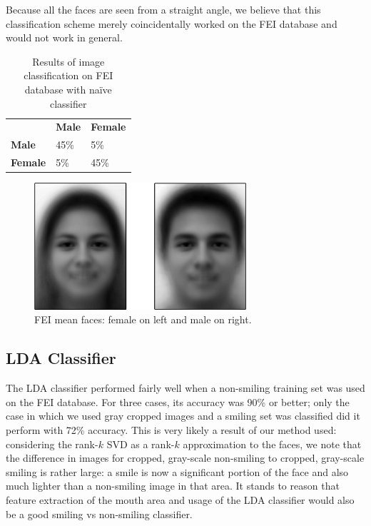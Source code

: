 \documentclass[hidelinks,11pt]{article}
\begin{document}
Because all the faces are seen from a straight angle, we believe that this
classification scheme merely coincidentally worked on the FEI database and would
not work in general.

\begin{table}[!ht]
  \vspace{20pt}
  \centering
  \begin{tabular}{lll}
    \toprule
                      & \bfseries Male  & \bfseries Female  \\
    \bfseries Male    & 45\%            & 5\%               \\
    \bfseries Female  & 5\%             & 45\%              \\
    \bottomrule
  \end{tabular}
  \caption{Results of image classification on FEI database with na\"ive
  classifier}
  \label{tab:analysis:naive:data}
  \vspace{20pt}
\end{table}

\begin{figure}[!ht]
  \centering
  \includegraphics[width=0.7\textwidth]{fei_mean_face_mf.png}
  \caption{FEI mean faces: female on left and male on right.}
  \label{fig:analysis:naive:mean}
\end{figure}

\subsection{LDA Classifier}
\label{sec:analysis:lda}

The LDA classifier performed fairly well when a non-smiling training set was
used on the FEI database. For three cases, its accuracy was 90\% or better; only
the case in which we used gray cropped images and a smiling set was classified
did it perform with 72\% accuracy. This is very likely a result of our method
used: considering the rank-$k$ SVD as a rank-$k$ approximation to the faces, we
note that the difference in images for cropped, gray-scale non-smiling to
cropped, gray-scale smiling is rather large: a smile is now a significant
portion of the face and also much lighter than a non-smiling image in that area.
It stands to reason that feature extraction of the mouth area and usage of the
LDA classifier would also be a good smiling vs non-smiling classifier.
\end{document}
